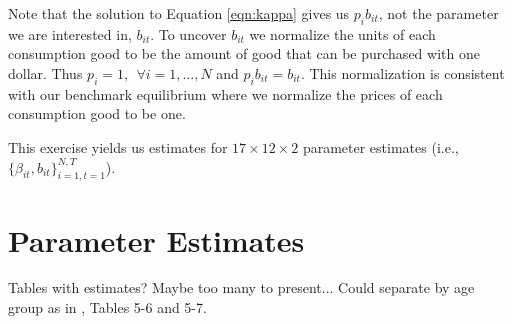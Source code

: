 \documentclass[article,11pt,letterpaper,fleqn]{article}
\theoremstyle{definition}
\numberwithin{equation}{section}
\newcommand{\cn}{\citeasnoun} %
\begin{document}
Note that the solution to Equation \ref{eqn:kappa} gives us $p_{i}b_{it}$, not the parameter we are interested in, $b_{it}$.  To uncover $b_{it}$ we normalize the units of each consumption good to be the amount of good that can be purchased with one dollar.  Thus $p_{i}=1, \ \ \forall i=1,...,N$ and $p_{i}b_{it}=b_{it}$.  This normalization is consistent with our benchmark equilibrium where we normalize the prices of each consumption good to be one.

This exercise yields us estimates for $17\times12\times2$ parameter estimates (i.e., $\{\beta_{it},b_{it}\}_{i=1,t=1}^{N,T}$).






\section{Parameter Estimates}

Tables with estimates?  Maybe too many to present...  Could separate by age group as in \cn{FR1993}, Tables 5-6 and 5-7.
\end{document}
